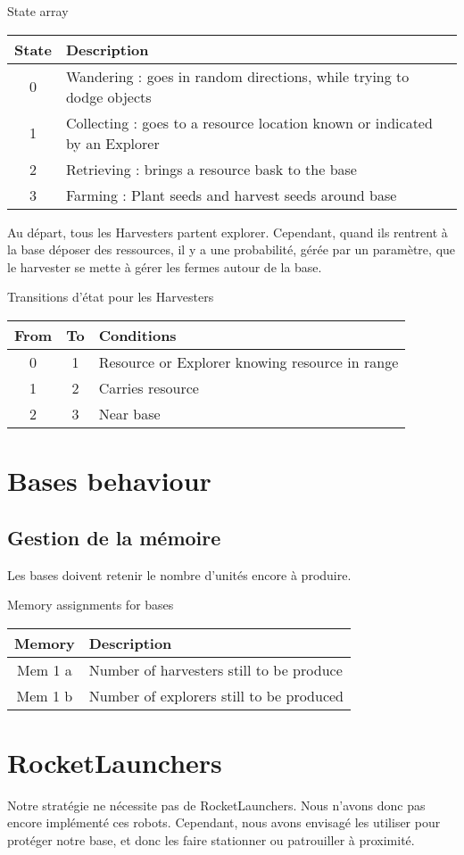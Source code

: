 \documentclass{article}
\begin{document}
\begin{table}[ht]
	State array\\
	\begin{tabular}{|c|l|}
		\hline
		State & Description \\
		\hline
		0 & Wandering : goes in random directions, while trying to dodge objects\\
		\hline
		1 & Collecting : goes to a resource location known or indicated by an Explorer\\
		\hline
		2 & Retrieving : brings a resource bask to the base\\
		\hline
		3 & Farming : Plant seeds and harvest seeds around base\\
		\hline
	\end{tabular}
\end{table}

Au départ, tous les Harvesters partent explorer.
Cependant, quand ils rentrent à la base déposer des ressources, il y a une probabilité, gérée par un paramètre, que le harvester se mette à gérer les fermes autour de la base.
\newline

\begin{table}[ht]
	Transitions d'état pour les Harvesters\\
	\begin{tabular}{|c|c|l|}
		\hline
		From & To & Conditions\\
		\hline
		0 & 1 & Resource or Explorer knowing resource in range\\
		\hline
		1 & 2 & Carries resource\\
		\hline
		2 & 3 & Near base\\
		\hline
	\end{tabular}
\end{table}

\section{Bases behaviour}

\subsection{Gestion de la mémoire}

Les bases doivent retenir le nombre d'unités encore à produire.
\begin{table}[ht]
	Memory assignments for bases\\
	\begin{tabular}{|c|l|}
		\hline
		Memory & Description\\
		\hline
		Mem 1 a & Number of harvesters still to be produce\\
		Mem 1 b & Number of explorers still to be produced\\
		\hline
	\end{tabular}
\end{table}

\section{RocketLaunchers}

Notre stratégie ne nécessite pas de RocketLaunchers.
Nous n'avons donc pas encore implémenté ces robots.
Cependant, nous avons envisagé les utiliser pour protéger notre base, et donc les faire stationner ou patrouiller à proximité.
\end{document}
